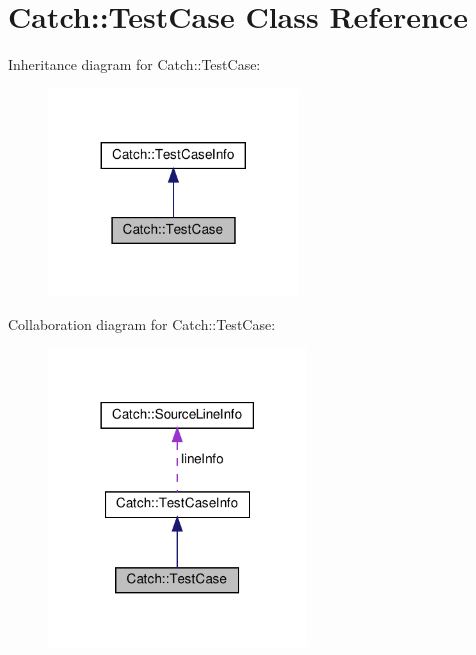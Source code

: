 \hypertarget{classCatch_1_1TestCase}{}\section{Catch\+:\+:Test\+Case Class Reference}
\label{classCatch_1_1TestCase}


Inheritance diagram for Catch\+:\+:Test\+Case\+:
\nopagebreak
\begin{figure}[H]
\begin{center}
\leavevmode
\includegraphics[width=188pt]{classCatch_1_1TestCase__inherit__graph}
\end{center}
\end{figure}


Collaboration diagram for Catch\+:\+:Test\+Case\+:
\nopagebreak
\begin{figure}[H]
\begin{center}
\leavevmode
\includegraphics[width=194pt]{classCatch_1_1TestCase__coll__graph}
\end{center}
\end{figure}
